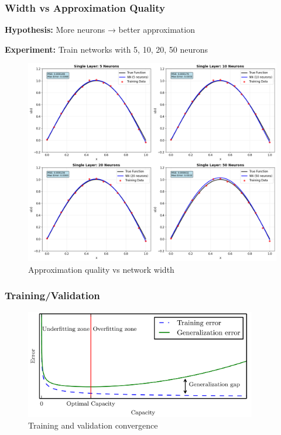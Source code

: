 \documentclass[notes]{beamer}
\begin{document}
\begin{frame}
\frametitle{Width vs Approximation Quality}

\textbf{Hypothesis:} More neurons → better approximation

\textbf{Experiment:} Train networks with 5, 10, 20, 50 neurons

\begin{figure}[ht]
	\centering
	\includegraphics[width=0.6\linewidth]{figs/width-quality.png}
	\caption*{Approximation quality vs network width}
\end{figure}
\end{frame}


\begin{frame}
\frametitle{Training/Validation}

\begin{figure}[ht]
	\centering
	\includegraphics[width=0.9\textwidth]{figs/training-validation-fit.png}
	\caption*{Training and validation convergence}
\end{figure}
\end{frame}
\end{document}
